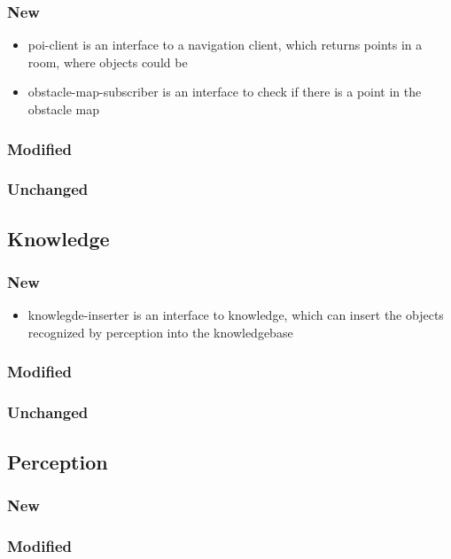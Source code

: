 \documentclass[main.tex]{subfiles}
\begin{document}
                \subsubsection{New}
                \begin{itemize}
 				 \item poi-client is an interface to a navigation client, which returns points in a room, where objects could be 
  				 \item obstacle-map-subscriber is an interface to check if there is a point in the obstacle map
				\end{itemize}  
                \subsubsection{Modified}
                \subsubsection{Unchanged}
                \subsection{Knowledge}
                \subsubsection{New}
                \begin{itemize}
 				 \item knowlegde-inserter is an interface to knowledge, which can insert the objects recognized by perception into the knowledgebase
				\end{itemize}
                \subsubsection{Modified}
                \subsubsection{Unchanged}
                \subsection{Perception}
                \subsubsection{New}
                \subsubsection{Modified}
\end{document}
